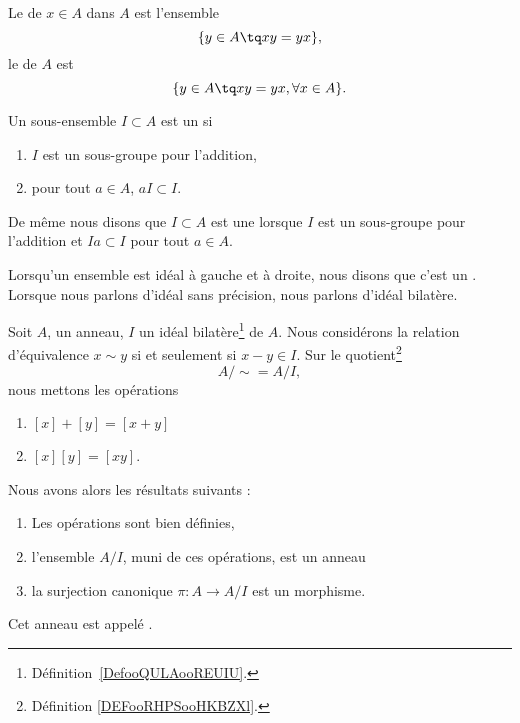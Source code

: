 \begin{definition}
    Le  de \( x\in A\) dans \( A\) est l'ensemble
    \begin{equation}
        \{ y\in A\tq xy=yx \},
    \end{equation}
    le  de \( A\) est
    \begin{equation}
        \{ y\in A\tq xy=yx,\forall x\in A \}.
    \end{equation}
\end{definition}

\begin{definition}  \label{DefooQULAooREUIU}
    Un sous-ensemble \( I\subset A\) est un  si
    \begin{enumerate}
        \item
            \( I\) est un sous-groupe pour l'addition,
        \item
            pour tout \( a\in A\), \( aI\subset I\).
    \end{enumerate}
    De même nous disons que \( I\subset A\) est une  lorsque \( I\) est un sous-groupe pour l'addition et \( Ia\subset I\) pour tout \( a\in A\).

    Lorsqu'un ensemble est idéal à gauche et à droite, nous disons que c'est un . Lorsque nous parlons d'idéal sans précision, nous parlons d'idéal bilatère.
\end{definition}

\begin{propositionDef}      \label{PROPooGXMRooTcUGbi}
    Soit \( A\), un anneau, \( I\) un idéal bilatère\footnote{Définition~\ref{DefooQULAooREUIU}.} de \( A\). Nous considérons la relation d'équivalence \( x\sim y\) si et seulement si \( x-y\in I\). Sur le quotient\footnote{Définition \ref{DEFooRHPSooHKBZXl}.}
    \begin{equation}
        A/\sim=A/I,
    \end{equation}
    nous mettons les opérations
    \begin{enumerate}
        \item
            \( [x]+[y]=[x+y]\)
        \item
            \( [x][y]=[xy]\).
    \end{enumerate}
    Nous avons alors les résultats suivants :
    \begin{enumerate}
        \item       \label{ITEMooEJPEooRKAqmS}
            Les opérations sont bien définies,
        \item       \label{ITEMooYBEGooTlHgNz}
            l'ensemble \( A/I\), muni de ces opérations, est un anneau
        \item       \label{ITEMooLNRLooMkoWXZ}
            la surjection canonique \( \pi\colon A\to A/I\) est un morphisme.
    \end{enumerate}
    Cet anneau est appelé .
\end{propositionDef}

